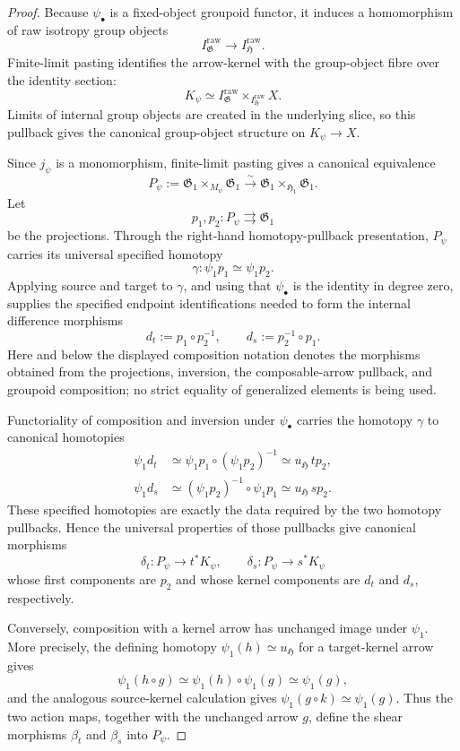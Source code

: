 \begin{proof}
Because $\psi_\bullet$ is a fixed-object groupoid functor, it induces a
homomorphism of raw isotropy group objects
\[
    I^{\mathrm{raw}}_{\mathfrak G}
    \longrightarrow
    I^{\mathrm{raw}}_{\mathfrak H}.
\]
Finite-limit pasting identifies the arrow-kernel with the group-object fibre
over the identity section:
\[
    K_\psi
    \simeq
    I^{\mathrm{raw}}_{\mathfrak G}
    \times_{I^{\mathrm{raw}}_{\mathfrak H}}
    X.
\]
Limits of internal group objects are created in the underlying slice, so this
pullback gives the canonical group-object structure on $K_\psi\to X$.

Since $j_\psi$ is a monomorphism, finite-limit pasting gives a canonical
equivalence
\[
    P_\psi
    :=
    \mathfrak G_1\times_{M_\psi}\mathfrak G_1
    \xrightarrow{\sim}
    \mathfrak G_1\times_{\mathfrak H_1}\mathfrak G_1.
\]
Let
\[
    p_1,p_2:P_\psi\rightrightarrows\mathfrak G_1
\]
be the projections.  Through the right-hand homotopy-pullback presentation,
$P_\psi$ carries its universal specified homotopy
\[
    \gamma:
    \psi_1p_1
    \simeq
    \psi_1p_2.
\]
Applying source and target to $\gamma$, and using that $\psi_\bullet$ is the
identity in degree zero, supplies the specified endpoint identifications
needed to form the internal difference morphisms
\[
    d_t:=p_1\circ p_2^{-1},
    \qquad
    d_s:=p_2^{-1}\circ p_1.
\]
Here and below the displayed composition notation denotes the morphisms
obtained from the projections, inversion, the composable-arrow pullback, and
groupoid composition; no strict equality of generalized elements is being
used.

Functoriality of composition and inversion under $\psi_\bullet$ carries the
homotopy $\gamma$ to canonical homotopies
\[
\begin{aligned}
    \psi_1d_t
    &\simeq
    \psi_1p_1\circ(\psi_1p_2)^{-1}
    \simeq
    u_{\mathfrak H}\,t p_2,\\
    \psi_1d_s
    &\simeq
    (\psi_1p_2)^{-1}\circ\psi_1p_1
    \simeq
    u_{\mathfrak H}\,s p_2.
\end{aligned}
\]
These specified homotopies are exactly the data required by the two homotopy
pullbacks.  Hence the universal properties of those pullbacks give canonical
morphisms
\[
    \delta_t:
    P_\psi\longrightarrow t^*K_\psi,
    \qquad
    \delta_s:
    P_\psi\longrightarrow s^*K_\psi
\]
whose first components are $p_2$ and whose kernel components are $d_t$ and
$d_s$, respectively.

Conversely, composition with a kernel arrow has unchanged image under
$\psi_1$.  More precisely, the defining homotopy
$\psi_1(h)\simeq u_{\mathfrak H}$ for a target-kernel arrow gives
\[
    \psi_1(h\circ g)
    \simeq
    \psi_1(h)\circ\psi_1(g)
    \simeq
    \psi_1(g),
\]
and the analogous source-kernel calculation gives
$\psi_1(g\circ k)\simeq\psi_1(g)$.  Thus the two action maps, together with
the unchanged arrow $g$, define the shear morphisms
$\beta_t$ and $\beta_s$ into $P_\psi$.


\end{proof}
